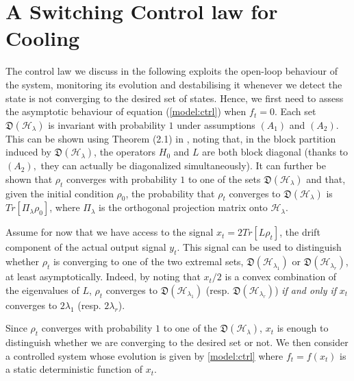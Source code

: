 \documentclass[conference]{IEEEtran}
\newcommand{\DHL}[1]{\mathfrak D(\mathcal H_{#1})}
\theoremstyle{plain}
\theoremstyle{plain}
\theoremstyle{plain}
\theoremstyle{plain}
\theoremstyle{remark}
\theoremstyle{definition}
\begin{document}
\section{A Switching Control law for Cooling}
\label{idcontr}
The control law we discuss in the following exploits the open-loop behaviour of the system, monitoring its evolution and destabilising it whenever we detect the state is not converging to the desired set of states. Hence, we first need to assess the asymptotic behaviour of equation (\ref{model:ctrl}) when $f_t = 0$. {Each set} $\DHL{\lambda}$ is invariant with probability $1$ under assumptions $(A_1)$ and $(A_2)$. {This can be shown using Theorem (2.1) in \cite{Benoist2017}, noting that, in the block partition induced by  $\DHL{\lambda}$, the operators $H_0$ and $L$ are both block diagonal (thanks to $(A_2),$ they can actually be diagonalized simultaneously).} 
It can further be shown that $\rho_t$ converges with probability $1$ to one of the sets $\DHL{\lambda}$\footnotemark{} and that, given the initial condition $\rho_0$, the probability that $\rho_t$ converges to $\DHL{\lambda}$ is $Tr[\Pi_\lambda \rho_0]$, where $\Pi_\lambda$ is the orthogonal projection matrix onto $\mathcal H_\lambda$.

Assume for now that we have access to the signal \(
    x_t = 2Tr[L\rho_t]
\),
the drift component of the actual output signal $y_t$. This signal can be used to distinguish whether $\rho_t$ is converging to one of the two extremal sets, $\DHL{\lambda_1}$ or $\DHL{\lambda_r}$, at least asymptotically. Indeed, by noting that $x_t/2$ is a convex combination of the eigenvalues of $L$, $\rho_t$ converges to $\DHL{\lambda_1}$ (resp. $\DHL{\lambda_r}$) {\em if and only if} $x_t$ converges to $2\lambda_1$ (resp. $2\lambda_r$).

Since $\rho_t$ converges with probability $1$ to one of the $\DHL{\lambda}$, $x_t$ is enough to distinguish whether we are converging to the desired set or not. We then consider a controlled system whose evolution is given by \eqref{model:ctrl}
where $f_t=f(x_t)$ is a static deterministic function of $x_t.$ 
\end{document}
